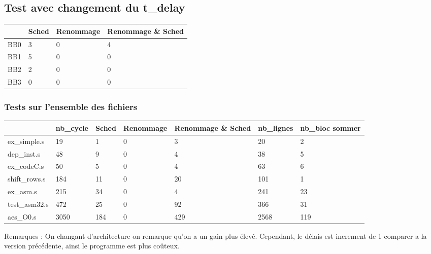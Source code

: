 \documentclass[11pt, openany]{article}
\begin{document}
\subsection{Test avec changement du t\_delay}


\begin{tabular}{|p{3.5cm}||p{3.5cm}|p{3.5cm}|p{3.5cm}|}
 \hline
  & Sched & Renommage & Renommage \& Sched\\
 \hline
  BB0 & 3 & 0 & 4 \\
  BB1 & 5 & 0 & 0 \\
  BB2 & 2 & 0 & 0 \\
  BB3 & 0 & 0 & 0 \\
 \hline
\end{tabular}


\subsubsection{Tests sur l'ensemble des fichiers}

\begin{tabular}{ |p{2.5cm}||p{2cm}|p{2.5cm}|p{2.5cm}|p{2.5cm}|p{2cm}|p{2cm}| }
 \hline
   & nb\_cycle & Sched & Renommage & Renommage \& Sched & nb\_lignes  & nb\_bloc sommer\\
 \hline
  ex\_simple.s & 19 & 1 & 0 & 3 & 20 & 2 \\
  dep\_inst.s & 48 & 9 & 0  & 4 & 38 & 5 \\
  ex\_codeC.s  & 50 & 5 & 0 & 4 & 63 & 6 \\
  shift\_rows.s  & 184 & 11 & 0 & 20 & 101 & 1 \\
  ex\_asm.s	& 215 & 34 & 0 & 4  & 241 & 23 \\
  test\_asm32.s  & 472 & 25 & 0 & 92 & 366 & 31\\
  aes\_O0.s  & 3050 & 184 & 0 & 429  & 2568 & 119\\
 \hline
\end{tabular}

\newline
Remarques :
On changant d'architecture on remarque qu'on a un gain plus élevé. Cependant, le délais est increment de 1 comparer a la version précédente, ainsi le programme est plus coûteux.
\end{document}
